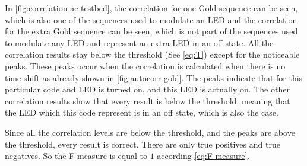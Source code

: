 

In \autoref{fig:correlation-ac-testbed}, the correlation for one Gold sequence can be seen, which is also one of the sequences used to modulate an LED and the correlation for the extra Gold sequence can be seen, which is not part of the sequences used to modulate any LED and represent an extra LED in an off state.
All the correlation results stay below the threshold (See \autoref{eq:T}) except for the noticeable peaks.
These peaks occur when the correlation is calculated when there is no time shift as already shown in \autoref{fig:autocorr-gold}.
The peaks indicate that for this particular code and LED is turned on, and this LED is actually on.
The other correlation results show that every result is below the threshold, meaning that the LED which this code represent is in an off state, which is also the case.

Since all the correlation levels are below the threshold, and the peaks are above the threshold, every result is correct.
There are only true positives and true negatives.
So the F-measure is equal to $1$ according \autoref{eq:F-measure}.

